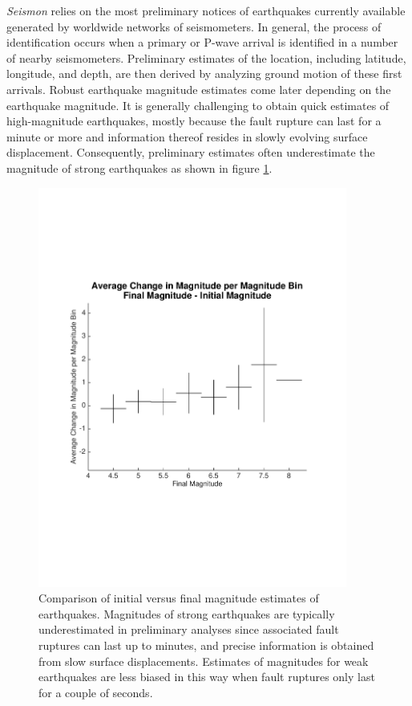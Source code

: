 \documentclass[reprint, prl, aps, showpacs]{revtex4-1}
\begin{document}
\emph{Seismon} relies on the most preliminary notices of earthquakes currently available generated by worldwide networks of seismometers. In general, the process of identification occurs when a primary or P-wave arrival is identified in a number of nearby seismometers. Preliminary estimates of the location, including latitude, longitude, and depth, are then derived by analyzing ground motion of these first arrivals. Robust earthquake magnitude estimates come later depending on the earthquake magnitude. It is generally challenging to obtain quick estimates of high-magnitude earthquakes, mostly because the fault rupture can last for a minute or more and information thereof resides in slowly evolving surface displacement. Consequently, preliminary estimates often underestimate the magnitude of strong earthquakes as shown in figure \ref{fig:initialfinal}.
\begin{figure}[t]
\hspace*{-0.5cm}
\centering
\includegraphics[width=4in]{AverageChange.pdf}
\caption{Comparison of initial versus final magnitude estimates of earthquakes. Magnitudes of strong earthquakes are typically underestimated in preliminary analyses since associated fault ruptures can last up to minutes, and precise information is obtained from slow surface displacements. Estimates of magnitudes for weak earthquakes are less biased in this way when fault ruptures only last for a couple of seconds.}
 \label{fig:initialfinal}
 \end{figure}
\end{document}
